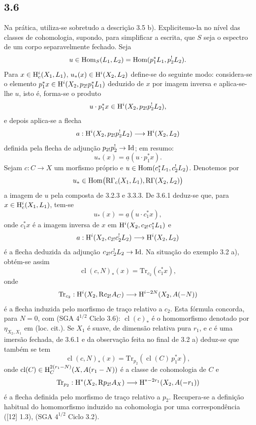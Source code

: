 \subsection*{3.6}
Na prática, utiliza-se sobretudo a descrição 3.5 b). Explicitemo-la no nível das classes de cohomologia, supondo, para simplificar a escrita, que $S$ seja o espectro de um corpo separavelmente fechado. Seja
\[
u\in\operatorname{Hom}_S(L_1,L_2)=\operatorname{Hom}(p_1^*L_1,p_2^!L_2).
\]
Para $x\in\mathrm{H}_c^i(X_1,L_1)$, $u_*(x)\in\mathrm{H}^i(X_2,L_2)$ define-se do seguinte modo: considera-se o elemento $p_1^*x\in\mathrm{H}^i(X_2,p_{2!}p_1^*L_1)$ deduzido de $x$ por imagem inversa e aplica-se-lhe $u$, isto é, forma-se o produto
\[
u\cdot p_1^*x\in \mathrm{H}^i(X_2,p_{2!}p_2^!L_2),
\]
e depois aplica-se a flecha
\[
a:\mathrm{H}^i(X_2,p_{2!}p_2^!L_2)\longrightarrow \mathrm{H}^i(X_2,L_2)
\]
definida pela flecha de adjunção $p_{2!}p_2^!\to\mathrm{Id}$; em resumo:
\begin{equation}
u_*(x)=\underline a(u\cdot p_1^*x).
\tag{3.6.1}
\end{equation}
Sejam $c:C\to X$ um morfismo próprio e $u\in\operatorname{Hom}(c_1^*L_1,c_2^!L_2)$. Denotemos por
\[
u_*\in\operatorname{Hom}\bigl(\mathrm{R}\Gamma_c(X_1,L_1),\mathrm{R}\Gamma(X_2,L_2)\bigr)
\]
a imagem de $u$ pela composta de 3.2.3 e 3.3.3. De 3.6.1 deduz-se que, para $x\in\mathrm{H}_c^i(X_1,L_1)$, tem-se
\begin{equation}
u_*(x)=\underline a(u\cdot c_1^*x),
\tag{3.6.2}
\end{equation}
onde $c_1^*x$ é a imagem inversa de $x$ em $\mathrm{H}^i(X_2,c_{2!}c_1^*L_1)$ e
\[
a:\mathrm{H}^i(X_2,c_{2!}c_2^!L_2)\longrightarrow \mathrm{H}^i(X_2,L_2)
\]
é a flecha deduzida da adjunção $c_{2!}c_2^!L_2\to\mathrm{Id}$. Na situação do exemplo 3.2 a), obtém-se assim
\begin{equation}
\operatorname{cl}(c,N)_*(x)=\mathrm{Tr}_{c_2}(c_1^*x),
\tag{3.6.3}
\end{equation}
onde
\[
\mathrm{Tr}_{c_2}:\mathrm{H}^i(X_2,\mathrm{R} c_{2!}A_C)\longrightarrow\mathrm{H}^{i-2N}(X_2,A(-N))
\]
é a flecha induzida pelo morfismo de traço relativo a $c_2$. Esta fórmula concorda, para $N=0$, com (SGA $4^{1/2}$ Ciclo 3.6): $\operatorname{cl}(c)_*$ é o homomorfismo denotado por $\eta_{X_2,X_1}$ em (loc. cit.). Se $X_1$ é suave, de dimensão relativa pura $r_1$, e $c$ é uma imersão fechada, de 3.6.1 e da observação feita no final de 3.2 a) deduz-se que também se tem
\begin{equation}
\operatorname{cl}(c,N)_*(x)=\mathrm{Tr}_{p_2}(\operatorname{cl}(C)\,p_1^*x),
\tag{3.6.4}
\end{equation}
onde $\operatorname{cl}(C)\in \mathrm{H}_C^{2(r_1-N)}(X,A(r_1-N))$ é a classe de cohomologia de $C$ e
\[
\mathrm{Tr}_{p_2}:\mathrm{H}^*(X_2,\mathrm{R} p_{2!}A_X)\longrightarrow \mathrm{H}^{*-2r_1}(X_2,A(-r_1))
\]
é a flecha definida pelo morfismo de traço relativo a $p_2$. Recupera-se a definição habitual do homomorfismo induzido na cohomologia por uma correspondência ([12] 1.3), (SGA $4^{1/2}$ Ciclo 3.2).

